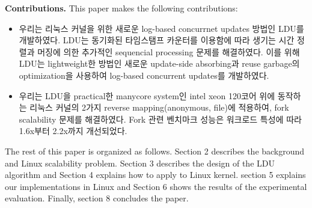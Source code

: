 \ifkor
\noindent
\textbf{Contributions.} This paper makes the following contributions:
\begin{itemize}
\item 우리는 리눅스 커널을 위한 새로운 log-based concurrnet updates 방법인 LDU를 개발하였다. 
LDU는 동기화된 타임스탬프 카운터를 이용함에 따라 생기는 시간 정렬과 머징에 의한 추가적인 sequencial processing 문제를
해결하였다.
이를 위해 LDU는 lightweight한 방법인 새로운 update-side absorbing과 reuse
garbage의 optimization을 사용하여 log-based concurrent updates를 개발하였다. 
\item 우리는 LDU을 practical한 manycore system인 intel xeon 120코어 위에 동작하는 리눅스 커널의
2가지 reverse mapping(anonymous, file)에 적용하여, fork scalability 문제를 해결하였다.
Fork 관련 벤치마크 성능은 워크로드 특성에 따라 1.6x부터 2.2x까지 개선되었다.
\end{itemize}
\else
\fi


\ifkor
The rest of this paper is organized as follows.
Section 2 describes the background and Linux scalability problem.
Section 3 describes the design of the LDU algorithm and 
Section 4 explains how to apply to Linux kernel.
section 5 explains our implementations in Linux and
Section 6 shows the results of the experimental evaluation. 
Finally, section 8 concludes the paper.
\else
\fi


